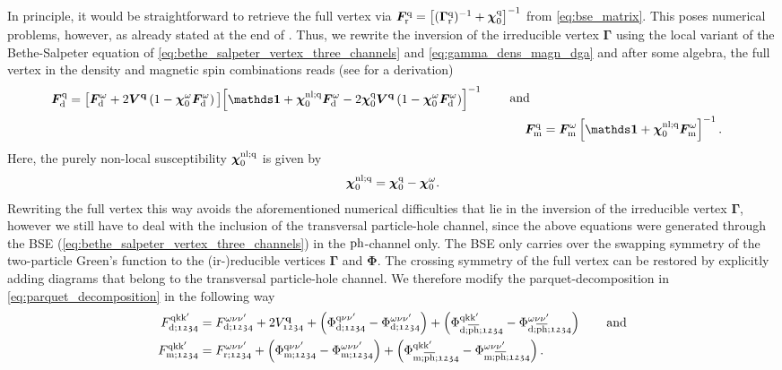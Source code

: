 \documentclass[../../main.tex]{subfiles}
\begin{document}
In principle, it would be straightforward to retrieve the full vertex via $\bm F_{\text{r}}^{\text{q}}=\left [(\bm\Gamma_{\text{r}}^{\text{q}})^{-1}+\bm\chi_{0}^{\text{q}}\right ]^{-1}$ from \eqref{eq:bse_matrix}. This poses numerical problems, however, as already stated at the end of . Thus, we rewrite the inversion of the irreducible vertex $\bm\Gamma$ using the local variant of the Bethe-Salpeter equation of \eqref{eq:bethe_salpeter_vertex_three_channels} and \eqref{eq:gamma_dens_magn_dga} and after some algebra, the full vertex in the density and magnetic spin combinations reads (see \cite{Galler2017} for a derivation)
\begin{subequations}
\begin{align}
\begin{split}
	\bm F_{\dens}^{\q}&=\big [\bm F_{\dens}^{\omega}+2\bm V^{\vv{q}}\left (1-\bm\chi_{0}^{\omega}\bm F_{\dens}^{\omega}\right )\big ]\!\left [\bm\unity+\bm\chi_{0}^{\nl;\q}\bm F_{\dens}^{\omega}-2\bm\chi_{0}^{\q}\bm V^{\vv{q}}\left (1-\bm\chi_{0}^{\omega}\bm F_{\dens}^{\omega}\right )\right ]^{-1}
\end{split}\;\quad\text{and}\quad\\
	\bm F_{\magn}^{\q}&=\bm F_{\magn}^{\omega}\left [\bm\unity+\bm\chi_{0}^{\nl;\q}\bm F_{\magn}^{\omega}\right ]^{-1}.
\end{align}
\end{subequations}
Here, the purely non-local susceptibility $\bm\chi_{0}^{\text{nl};\text{q}}$ is given by
\begin{align}
	\bm\chi_{0}^{\text{nl};\text{q}}=\bm\chi_{0}^{\text{q}}-\bm\chi_{0}^{\omega}.
\end{align}
Rewriting the full vertex this way avoids the aforementioned numerical difficulties that lie in the inversion of the irreducible vertex $\bm\Gamma$, however we still have to deal with the inclusion of the transversal particle-hole channel, since the above equations were generated through the BSE (\ref{eq:bethe_salpeter_vertex_three_channels}) in the $\text{ph}$-channel only. The BSE only carries over the swapping symmetry of the two-particle Green's function to the (ir-)reducible vertices $\bm\Gamma$ and $\bm\Phi$. The crossing symmetry of the full vertex can be restored by explicitly adding diagrams that belong to the transversal particle-hole channel. We therefore modify the parquet-decomposition in \eqref{eq:parquet_decomposition} in the following way
\begin{align}\label{eq:full_vertex_crossing_symmetric_dga}
	F^{\text{q}\text{k}\text{k}'}_{\text{d};\mathfrak{1234}}&=F^{\omega\nu\nu'}_{\text{d};\mathfrak{1234}}+2 V_{\mathfrak{1234}}^{\textbf{q}}+\left (\Phi^{\text{q}\nu\nu'}_{\text{d};\mathfrak{1234}}-\Phi^{\omega\nu\nu'}_{\text{d};\mathfrak{1234}}\right )+\left (\Phi^{\text{q}\text{k}\text{k}'}_{\text{d};\overline{\text{ph}};\mathfrak{1234}}-\Phi^{\omega\nu\nu'}_{\text{d};\overline{\text{ph}};\mathfrak{1234}}\right )\qquad\text{and}\\
	F^{\text{q}\text{k}\text{k}'}_{\text{m};\mathfrak{1234}}&=F^{\omega\nu\nu'}_{\text{r};\mathfrak{1234}}+\left (\Phi^{\text{q}\nu\nu'}_{\text{m};\mathfrak{1234}}-\Phi^{\omega\nu\nu'}_{\text{m};\mathfrak{1234}}\right )+\left (\Phi^{\text{q}\text{k}\text{k}'}_{\text{m};\overline{\text{ph}};\mathfrak{1234}}-\Phi^{\omega\nu\nu'}_{\text{m};\overline{\text{ph}};\mathfrak{1234}}\right ).
\end{align}
\end{document}
